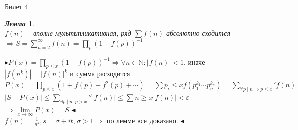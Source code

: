 \documentclass[a4paper,12pt]{article}
\newtheorem{lem}{\textit{Лемма}}
\newcommand{\q}{\quad}
\newcommand{\pb}{\blacktriangleright}
\newcommand{\pe}{\blacktriangleleft}
\newcommand{\Ra}{\Rightarrow}
\newcommand{\bb}[1]{\mathbb{#1}}
\newcommand{\SL}{\sum\limits}
\begin{document}
\newpage
\begin{mybox2}{{Билет 4}}
\begin{formbox}{}
\begin{lem}\q\\
$f(n)$ -- вполне мультипликативная, ряд $\sum f(n)$ абсолютно сходится $\Ra S = \SL_{n=2}^\infty f(n) = \prod\limits_p (1-f(p))^{-1}  $
\end{lem}
\end{formbox}
$\pb P(x) = \prod\limits_{p\le x} (1-f(p))^{-1}  \Ra \forall n\in\bb{N}: |f(n)| < 1$, иначе $|f(n^k)| = |f(n)|^k$ и сумма расходится\\
$P(x) = \prod\limits_{p\le x} (1 + f(p) + f^2(p) + \cdots) = \SL{p_i\le x} f(p_1^{k_1}\cdots p_n^{k_n}) = \SL_{\forall p\mid n\Ra p \le x}' f(n)$\\
$|S-P(x)| \le \SL_{\exists p\mid n:p>x}''|f(n)|\le\SL{n \ge x}|f(n)| < \varepsilon$\\
$\Ra\lim\limits_{x\to\infty}P(x) = S$
$\pe$\\
$f(n) = \frac{1}{n^s}, s = \sigma + it, \sigma > 1\Ra$ по лемме все доказано. $\pe$

\end{mybox2}
\end{document}
